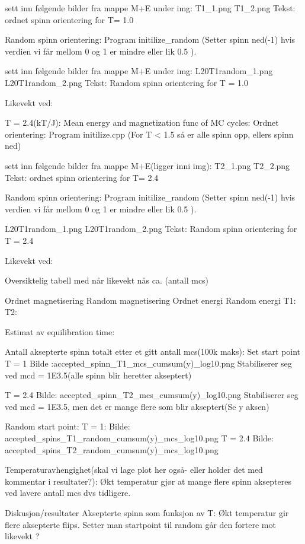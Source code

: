 \documentclass[../main.tex]{subfiles}
\begin{document}
sett inn følgende bilder fra mappe M+E under img:
T1_1.png
T1_2.png
Tekst: ordnet spinn orientering for T= 1.0

Random spinn orientering: Program initilize_random (Setter spinn ned(-1)
hvis verdien vi får mellom 0 og 1 er mindre eller lik 0.5 ).

sett inn følgende bilder fra mappe M+E under img:
L20T1random_1.png
L20T1random_2.png
Tekst: Random spinn orientering for T = 1.0


Likevekt ved:

T = 2.4(kT/J):
Mean energy and magnetization func of MC cycles:
Ordnet orientering: Program initilize.cpp (For T < 1.5 så er alle spinn opp,
ellers spinn ned)

sett inn følgende bilder fra mappe M+E(ligger inni img):
T2_1.png
T2_2.png
Tekst: ordnet spinn orientering for T= 2.4

Random spinn orientering: Program initilize_random (Setter spinn ned(-1)
hvis verdien vi får mellom 0 og 1 er mindre eller lik 0.5 ).

L20T1random_1.png
L20T1random_2.png
Tekst: Random spinn orientering for T = 2.4


Likevekt ved:

Oversiktelig tabell med når likevekt nås ca. (antall mcs)

    Ordnet magnetisering  Random magnetisering  Ordnet energi Random energi
T1:
T2:

Estimat av equilibration time:


Antall aksepterte spinn totalt etter et gitt antall mcs(100k maks):
Set start point
T = 1
Bilde :accepted_spinn_T1_mcs_cumsum(y)_log10.png
Stabiliserer seg ved mcd = 1E3.5(alle spinn blir heretter akseptert)

T = 2.4
Bilde: accepted_spinn_T2_mcs_cumsum(y)_log10.png
Stabiliserer seg ved mcd = 1E3.5, men det er mange flere som blir akseptert(Se y aksen)



Random start point:
T = 1:
Bilde: accepted_spins_T1_random_cumsum(y)_mcs_log10.png
T = 2.4
Bilde: accepted_spins_T2_random_cumsum(y)_mcs_log10.png

Temperaturavhengighet(skal vi lage plot her også- eller holder det med kommentar i resultater?):
Økt temperatur gjør at mange flere spinn aksepteres ved lavere antall mcs dvs tidligere.


Diskusjon/resultater
Aksepterte spinn som funksjon av T:
Økt temperatur gir flere aksepterte flips.
Setter man startpoint til random går den fortere mot likevekt ?
\end{document}

